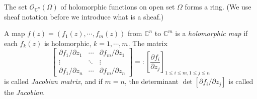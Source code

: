 \begin{cor}
    The set $\mathcal{O}_{\mathbb{C}^n}(\Omega)$ of holomorphic functions on open set $\Omega$ forms a ring. (We use sheaf notation before we introduce what is a sheaf.)
\end{cor}

\begin{defn}
    A map $f(z)=(f_1(z),\cdots,f_m(z))$ from $\mathbb{C}^n$ to $\mathbb{C}^m$ is a \emph{holomorphic map} if each $f_k(z)$ is holomorphic, $k=1,\cdots,m$.
    The matrix
    \[\begin{bmatrix}
        \partial{f_1}/\partial{z_1} & \cdots & \partial{f_m}/\partial{z_1}\\
        \vdots & \ddots & \vdots \\
        \partial{f_1}/\partial{z_n} & \cdots & \partial{f_m}/\partial{z_n}
    \end{bmatrix}=:\left[\frac{\partial{f_i}}{\partial{z_j}}\right]_{1\leq i\leq m,1\leq j\leq n}\]
    is called \emph{Jacobian matrix}, and if $m=n$, the determinant $\det[\partial{f_i}/\partial{z_j}]$ is called the \emph{Jacobian}.
\end{defn}

